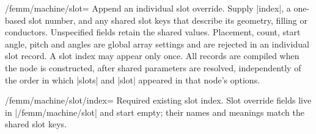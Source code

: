 \begin{key}{/femm/machine/slot=}
Append an individual slot override. Supply |index|, a one-based slot number,
and any shared slot keys that describe its geometry, filling or conductors.
Unspecified fields retain the shared values. Placement, count, start angle, pitch and angles are global
array settings and are rejected in an individual slot record.
A slot index may appear only once. All records are compiled when the node is
constructed, after shared parameters are resolved, independently of the order
in which |slots| and |slot| appeared in that node's options.
\end{key}
\begin{key}{/femm/machine/slot/index=}
Required existing slot index. Slot override fields live in |/femm/machine/slot|
and start empty; their names and meanings match the shared slot keys.
\end{key}

